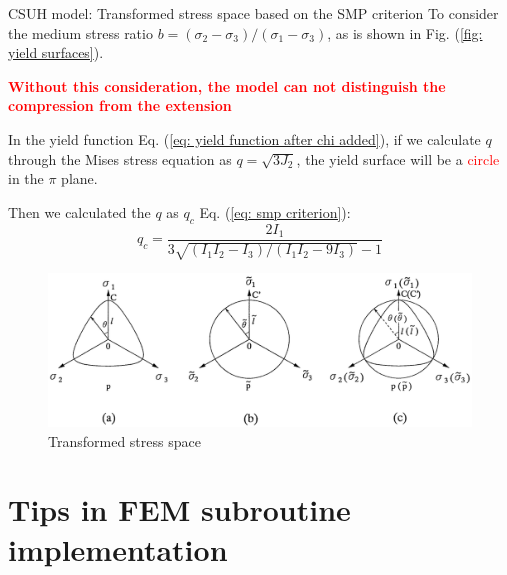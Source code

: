 \documentclass[aspectratio=169]{beamer}
\begin{document}
\begin{frame}{CSUH model: Transformed stress space based on the SMP criterion}
	\fontsize{9}{9}\selectfont
	To consider the medium stress ratio $b = (\sigma_2-\sigma_3)/(\sigma_1-\sigma_3)$, as is shown in Fig. (\ref{fig: yield surfaces}).
	
	\vspace{2mm}
	\textcolor{red}{\textbf{Without this consideration, the model can not distinguish the compression from the extension}}

\begin{minipage}[c]{0.3\linewidth}
	In the yield function Eq. (\ref{eq: yield function after chi added}), if we calculate $q$ through the Mises stress equation as $q = \sqrt{3J_2}$, the yield surface will be a \textcolor{red}{circle} in the $\pi$ plane. 
	
	\vspace{2mm}
	Then we calculated the $q$ as $q_c$ Eq. (\ref{eq: smp criterion}):
	\begin{equation}
		q_{c}=\frac{2 I_{1}}{3 \sqrt{\left(I_{1} I_{2}-I_{3}\right) /\left(I_{1} I_{2}-9 I_{3}\right)}-1}
	\end{equation} 
\end{minipage}
\hspace{2mm}
\begin{minipage}[c]{0.67\linewidth}
\begin{figure}
	\centering
	\includegraphics[width=\linewidth]{./pic/transformed space}
	\caption{Transformed stress space}
	\label{fig: transformed-space}
\end{figure}
\end{minipage}
\end{frame}

\section{Tips in FEM subroutine implementation}
\end{document}
